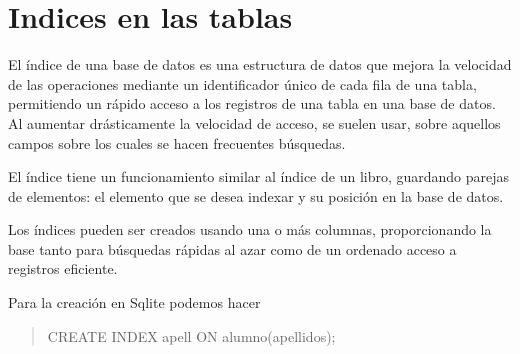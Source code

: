 \documentclass[4paper]{article}
\renewcommand{\S}{Sqlite }
\begin{document}
\section{Indices en las tablas}
El índice de una base de datos es una estructura de datos que mejora la velocidad de las operaciones mediante un identificador único de cada fila de una tabla, permitiendo un rápido acceso a los registros de una tabla en una base de datos. Al aumentar drásticamente la velocidad de acceso, se suelen usar, sobre aquellos campos sobre los cuales se hacen frecuentes búsquedas.\par
El índice tiene un funcionamiento similar al índice de un libro, guardando parejas de elementos: el elemento que se desea indexar y su posición en la base de datos.\par
Los índices pueden ser creados usando una o más columnas, proporcionando la base tanto para búsquedas rápidas al azar como de un ordenado acceso a registros eficiente.\par
Para la creación en \S podemos hacer\par
\begin{quote}
CREATE INDEX apell ON alumno(apellidos);
\end{quote}
\end{document}
